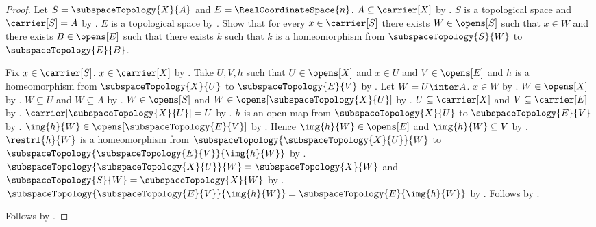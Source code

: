 \begin{proof}
    Let $S=\subspaceTopology{X}{A}$ and $E=\RealCoordinateSpace{n}$.
    $A\subseteq\carrier[X]$ by .
    $S$ is a topological space and $\carrier[S]=A$ by
        .
    $E$ is a topological space by .
    Show that for every $x\in\carrier[S]$ there exists $W\in\opens[S]$ such that
        $x\in W$ and there exists $B\in\opens[E]$ such that there exists $k$ such that
        $k$ is a homeomorphism from $\subspaceTopology{S}{W}$ to $\subspaceTopology{E}{B}$.
    \begin{subproof}
        Fix $x\in\carrier[S]$.
        $x\in\carrier[X]$ by .
        Take $U,V,h$ such that $U\in\opens[X]$ and $x\in U$ and $V\in\opens[E]$ and
            $h$ is a homeomorphism from $\subspaceTopology{X}{U}$ to $\subspaceTopology{E}{V}$ by
            .
        Let $W=U\inter A$.
        $x\in W$ by .
        $W\in\opens[X]$ by .
        $W\subseteq U$ and $W\subseteq A$ by .
        $W\in\opens[S]$ and $W\in\opens[\subspaceTopology{X}{U}]$ by
            .
        $U\subseteq\carrier[X]$ and $V\subseteq\carrier[E]$ by .
        $\carrier[\subspaceTopology{X}{U}]=U$ by .
        $h$ is an open map from $\subspaceTopology{X}{U}$ to $\subspaceTopology{E}{V}$ by
            .
        $\img{h}{W}\in\opens[\subspaceTopology{E}{V}]$ by .
        Hence $\img{h}{W}\in\opens[E]$ and $\img{h}{W}\subseteq V$ by
            .
        $\restrl{h}{W}$ is a homeomorphism from
            $\subspaceTopology{\subspaceTopology{X}{U}}{W}$ to
            $\subspaceTopology{\subspaceTopology{E}{V}}{\img{h}{W}}$ by
            .
        $\subspaceTopology{\subspaceTopology{X}{U}}{W}=\subspaceTopology{X}{W}$ and
            $\subspaceTopology{S}{W}=\subspaceTopology{X}{W}$ by
            .
        $\subspaceTopology{\subspaceTopology{E}{V}}{\img{h}{W}}
            =\subspaceTopology{E}{\img{h}{W}}$ by .
        Follows by .
    \end{subproof}
    Follows by .
\end{proof}

